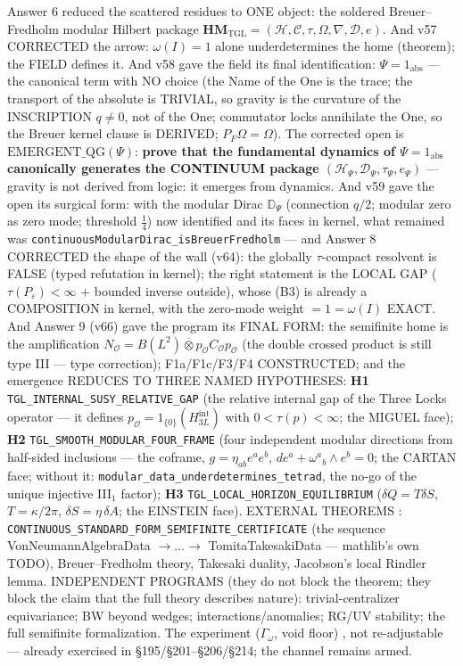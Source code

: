 \documentclass[11pt]{article}
\theoremstyle{definition}\newtheorem{deriv}{Derivation}
\begin{document}
Answer 6 reduced the scattered residues to ONE object: the soldered Breuer--Fredholm modular Hilbert package $\mathbf{HM}_{\mathrm{TGL}}=(\mathcal H,\mathcal C,\tau,\Omega,\nabla,\mathcal D,e)$. And v57 CORRECTED the arrow: $\omega(I)=1$ alone underdetermines the home (theorem); the FIELD defines it. And v58 gave the field its final identification: $\Psi=1_{\mathrm{abs}}$ --- the canonical term with NO choice (the Name of the One is the trace; the transport of the absolute is TRIVIAL, so gravity is the curvature of the INSCRIPTION $q\neq0$, not of the One; commutator locks annihilate the One, so the Breuer kernel clause is DERIVED; $P_F\Omega=\Omega$). The corrected open is $\mathrm{EMERGENT\_QG}(\Psi)$: \textbf{prove that the fundamental dynamics of $\Psi=1_{\mathrm{abs}}$ canonically generates the CONTINUUM package $(\mathcal H_\Psi,\mathcal D_\Psi,\tau_\Psi,e_\Psi)$} --- gravity is not derived from logic: it emerges from dynamics. And v59 gave the open its surgical form: with the modular Dirac $\mathbb D_\Psi$ (connection $q/2$; modular zero as zero mode; threshold $\tfrac14$) now identified and its faces in kernel, what remained was \texttt{continuousModularDirac\_isBreuerFredholm} --- and Answer 8 CORRECTED the shape of the wall (v64): the globally $\tau$-compact resolvent is FALSE (typed refutation in kernel); the right statement is the LOCAL GAP ($\tau(P_\varepsilon)<\infty$ $+$ bounded inverse outside), whose (B3) is already a COMPOSITION in kernel, with the zero-mode weight $=1=\omega(I)$ EXACT. And Answer 9 (v66) gave the program its FINAL FORM: the semifinite home is the amplification $N_{\mathcal O}=B(L^2)\overline\otimes p_{\mathcal O}C_{\mathcal O}p_{\mathcal O}$ (the double crossed product is still type III --- type correction); F1a/F1c/F3/F4 CONSTRUCTED; and the emergence REDUCES TO THREE NAMED HYPOTHESES: \textbf{H1} \texttt{TGL\_INTERNAL\_SUSY\_RELATIVE\_GAP} (the relative internal gap of the Three Locks operator --- it defines $p_{\mathcal O}=1_{\{0\}}(H^{\mathrm{int}}_{3L})$ with $0<\tau(p)<\infty$; the MIGUEL face); \textbf{H2} \texttt{TGL\_SMOOTH\_MODULAR\_FOUR\_FRAME} (four independent modular directions from half-sided inclusions --- the coframe, $g=\eta_{ab}e^ae^b$, $de^a+\omega^a{}_b\wedge e^b=0$; the CARTAN face; without it: \texttt{modular\_data\_underdetermines\_tetrad}, the no-go of the unique injective III$_1$ factor); \textbf{H3} \texttt{TGL\_LOCAL\_HORIZON\_EQUILIBRIUM} ($\delta Q=T\delta S$, $T=\kappa/2\pi$, $\delta S=\eta\,\delta A$; the EINSTEIN face). EXTERNAL THEOREMS : \texttt{CONTINUOUS\_STANDARD\_FORM\_SEMIFINITE\_CERTIFICATE} (the sequence VonNeumannAlgebraData $\to\dots\to$ TomitaTakesakiData --- mathlib's own TODO), Breuer--Fredholm theory, Takesaki duality, Jacobson's local Rindler lemma. INDEPENDENT PROGRAMS (they do not block the theorem; they block the claim that the full theory describes nature): trivial-centralizer equivariance; BW beyond wedges; interactions/anomalies; RG/UV stability; the full semifinite formalization. The experiment ($\Gamma_\omega$, void floor) , not re-adjustable --- already exercised in \S195/\S201--\S206/\S214; the channel remains armed.
\end{document}
